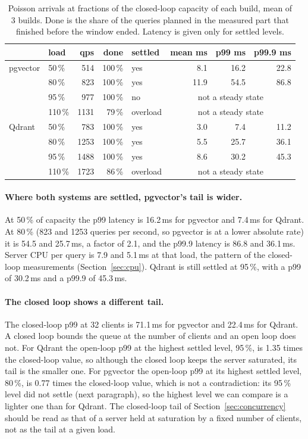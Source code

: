 \documentclass[sigconf, nonacm]{acmart}
\begin{document}
\begin{table}[t]
  \caption{Poisson arrivals at fractions of the closed-loop capacity of each build, mean of 3 builds. Done is the
  share of the queries planned in the measured part that finished before the window ended. Latency is given only for settled levels.}
  \label{tab:openloop}
  \small
  \begin{tabular}{@{}llrrlrrr@{}}
    \toprule
    & load & qps & done & settled & mean ms & p99 ms & p99.9 ms \\
    \midrule
    pgvector & 50\,\% & 514 & 100\,\% & yes & 8.1 & 16.2 & 22.8 \\
     & 80\,\% & 823 & 100\,\% & yes & 11.9 & 54.5 & 86.8 \\
     & 95\,\% & 977 & 100\,\% & no & \multicolumn{3}{c}{not a steady state} \\
     & 110\,\% & 1131 & 79\,\% & overload & \multicolumn{3}{c}{not a steady state} \\
    \addlinespace
    Qdrant & 50\,\% & 783 & 100\,\% & yes & 3.0 & 7.4 & 11.2 \\
     & 80\,\% & 1253 & 100\,\% & yes & 5.5 & 25.7 & 36.1 \\
     & 95\,\% & 1488 & 100\,\% & yes & 8.6 & 30.2 & 45.3 \\
     & 110\,\% & 1723 & 86\,\% & overload & \multicolumn{3}{c}{not a steady state} \\
    \bottomrule
  \end{tabular}
\end{table}

\paragraph{Where both systems are settled, pgvector's tail is wider.} At 50\,\% of capacity the p99 latency is 16.2\,ms for pgvector and
7.4\,ms for Qdrant. At 80\,\% (823 and 1253 queries per second, so pgvector is at a lower absolute rate) it is 54.5
and 25.7\,ms, a factor of 2.1, and the p99.9 latency is 86.8 and 36.1\,ms. Server CPU per query is
7.9 and 5.1\,ms at that load, the pattern of the closed-loop measurements (Section~\ref{sec:cpu}). Qdrant is still settled at
95\,\%, with a p99 of 30.2\,ms and a p99.9 of 45.3\,ms.

\paragraph{The closed loop shows a different tail.} The closed-loop p99 at 32 clients is 71.1\,ms for pgvector and 22.4\,ms for Qdrant. A closed loop bounds the
queue at the number of clients and an open loop does not. For Qdrant the open-loop p99 at the highest settled level, 95\,\%, is 1.35 times the closed-loop value, so
although the closed loop keeps the server saturated, its tail is the smaller one. For pgvector the open-loop p99 at its highest settled level, 80\,\%, is
0.77 times the closed-loop value, which is not a contradiction: its 95\,\% level did not settle (next paragraph), so the highest level we can compare is a lighter one than for Qdrant.
The closed-loop tail of Section~\ref{sec:concurrency} should be read as that of a server held at saturation by a fixed number of clients, not as the tail at a given load.
\end{document}
